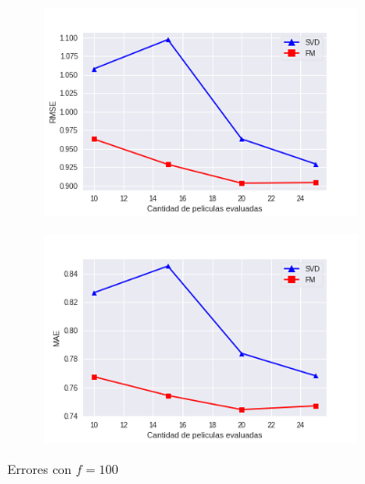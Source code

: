 \documentclass[hidelinks,12pt,a4paper]{book}
\theoremstyle{plain}
\theoremstyle{definition}
\begin{document}
\begin{figure}[ht]
\centering
    \begin{subfigure}[b]{0.5\textwidth}            
            \includegraphics[width=\textwidth]{graficos/entr-100-rmse.png}
    \end{subfigure}%
    \begin{subfigure}[b]{0.5\textwidth}
            \centering
            \includegraphics[width=\textwidth]{graficos/entr-100-mae.png}
    \end{subfigure}
    \caption{Errores con $f=100$}\label{fig:entr4}
\end{figure}
\end{document}
